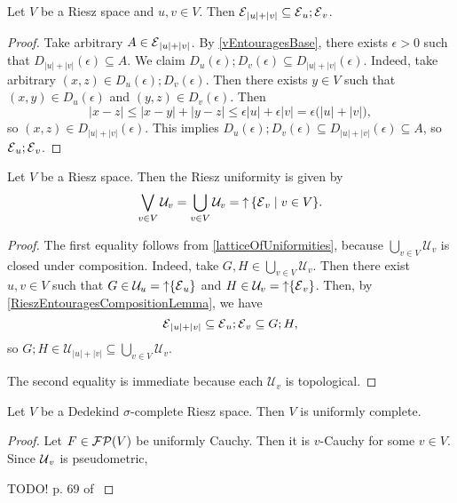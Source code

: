 \begin{lemma} \label{RieszEntouragesCompositionLemma}
Let $V$ be a Riesz space and $u,v\in V$. Then $\operatorname{\mathcal{E}}_{|u|+|v|} \subseteq \operatorname{\mathcal{E}}_{u};\operatorname{\mathcal{E}}_{v}$.
\end{lemma}
\begin{proof}
Take arbitrary $A\in \operatorname{\mathcal{E}}_{|u|+|v|}$. By \ref{vEntouragesBase}, there exists $\epsilon > 0$ such that $D_{|u|+|v|}(\epsilon) \subseteq A$. We claim $D_{u}(\epsilon);D_{v}(\epsilon) \subseteq D_{|u|+|v|}(\epsilon)$. Indeed, take arbitrary $(x,z) \in D_{u}(\epsilon);D_{v}(\epsilon)$. Then there exists $y\in V$ such that $(x,y)\in D_{u}(\epsilon)$ and $(y,z)\in D_{v}(\epsilon)$. Then
\[ |x-z| \leq |x-y|+ |y-z| \leq \epsilon |u| + \epsilon |v| = \epsilon\big(|u|+|v|\big), \]
so $(x,z) \in D_{|u|+|v|}(\epsilon)$. This implies $D_{u}(\epsilon);D_{v}(\epsilon) \subseteq D_{|u|+|v|}(\epsilon) \subseteq A$, so $\operatorname{\mathcal{E}}_{u};\operatorname{\mathcal{E}}_{v}$.
\end{proof}

\begin{proposition}
Let $V$ be a Riesz space. Then the Riesz uniformity is given by
\[ \bigvee_{v\in V} \mathcal{U}_v = \bigcup_{v\in V} \mathcal{U}_v = \upset \setbuilder{\entourages_v}{v\in V}. \]
\end{proposition}
\begin{proof}
The first equality follows from \ref{latticeOfUniformities}, because $\bigcup_{v\in V} \mathcal{U}_v$ is closed under composition. Indeed, take $G,H\in \bigcup_{v\in V} \mathcal{U}_v$. Then there exist $u,v\in V$ such that $G \in\mathcal{U}_u = \operatorname{\uparrow} \{\operatorname{\mathcal{E}}_u\}$ and $H \in\mathcal{U}_v = \operatorname{\uparrow} \{\operatorname{\mathcal{E}}_v\}$. Then, by \ref{RieszEntouragesCompositionLemma}, we have
\[ \operatorname{\mathcal{E}}_{|u|+|v|} \subseteq \operatorname{\mathcal{E}}_{u};\operatorname{\mathcal{E}}_{v} \subseteq G;H, \]
so $G;H\in \mathcal{U}_{|u|+|v|} \subseteq \bigcup_{v\in V} \mathcal{U}_v$.

The second equality is immediate because each $\mathcal{U}_v$ is topological.
\end{proof}

\begin{proposition} \label{DedekindSigmaCompleteRieszSpaceUniformlyComplete}
Let $V$ be a Dedekind $\sigma$-complete Riesz space. Then $V$ is uniformly complete.
\end{proposition}
\begin{proof}
Let $F\in \operatorname{\mathcal{FP}}(V)$ be uniformly Cauchy. Then it is $v$-Cauchy for some $v\in V$. Since $\operatorname{\mathcal{U}}_v$ is pseudometric, 

TODO! p. 69 of \cite{zaanen_introOperatorTheoryRieszSpaces}
\end{proof}

